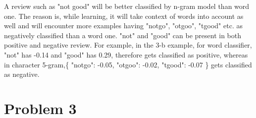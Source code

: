 \documentclass[12pt]{article}
\begin{document}
\begin{enumerate}[label=(\alph*)]
	A review such as "not good" will be better classified by n-gram model than word one. The reason is, while learning, it will take context of words into account as well and will encounter more examples having "notgo", "otgoo", "tgood" etc. as negatively classified than a word one. "not" and "good" can be present in both positive and negative review. For example, in the 3-b example, for word classifier, "not" has -0.14 and "good" has 0.29, therefore gets classified as positive, whereas in character 5-gram,\{ "notgo": -0.05, "otgoo": -0.02, "tgood": -0.07 \} gets classified as negative. 


\end{enumerate}

\section*{Problem 3}
\end{document}
